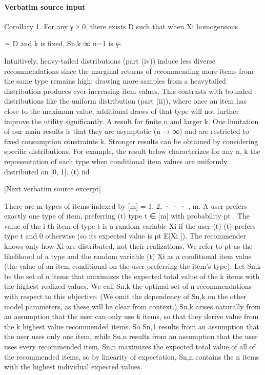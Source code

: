 \documentclass[10pt]{article}
\begin{document}
\paragraph{Verbatim source input}
\begin{ReviewVerbatim}
Corollary 1. For any γ ≥ 0, there exists D such that when Xi
homogeneous.

∼ D and k is fixed, {Sn,k }∞
n=1 is γ-

Intuitively, heavy-tailed distributions (part (iv)) induce less diverse recommendations since the marginal
returns of recommending more items from the same type remains high: drawing more samples from a heavytailed distribution produces ever-increasing item values. This contrasts with bounded distributions like the
uniform distribution (part (ii)), where once an item has close to the maximum value, additional draws of
that type will not further improve the utility significantly.
A result for finite n and larger k. One limitation of our main results is that they are asymptotic (n → ∞)
and are restricted to fixed consumption constraints k. Stronger results can be obtained by considering specific
distributions. For example, the result below characterizes for any n, k the representation of each type when
conditional item values are uniformly distributed on [0, 1].
(t) iid

[Next verbatim source excerpt]

There are m types of items indexed by [m] = {1, 2, · · · , m}. A user prefers exactly one type of item, preferring
(t)
type t ∈ [m] with probability pt . The value of the i-th item of type t is a random variable Xi if the user
(t)
(t)
prefers type t and 0 otherwise (so its expected value is pt E[Xi ]). The recommender knows only how Xi
are distributed, not their realizations. We refer to pt as the likelihood of a type and the random variable
(t)
Xi as a conditional item value (the value of an item conditional on the user preferring the item’s type).
Let Sn,k be the set of n items that maximizes the expected total value of the k items with the highest
realized values. We call Sn,k the optimal set of n recommendations with respect to this objective. (We omit
the dependency of Sn,k on the other model parameters, as these will be clear from context.)
Sn,k arises naturally from an assumption that the user can only use k items, so that they derive value
from the k highest value recommended items. So Sn,1 results from an assumption that the user uses only
one item, while Sn,n results from an assumption that the user uses every recommended item.
Sn,n maximizes the expected total value of all of the recommended items, so by linearity of expectation,
Sn,n contains the n items with the highest individual expected values.
\end{ReviewVerbatim}
\end{document}
